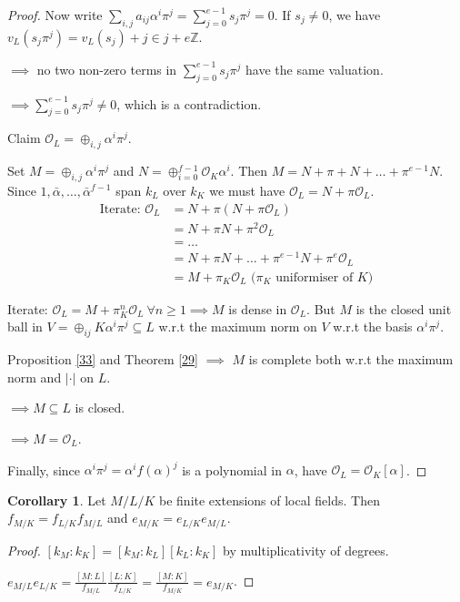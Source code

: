\documentclass[a4paper]{article}
\theoremstyle{definition}
\theoremstyle{default}
\newtheorem{corollary}[definition]{Corollary}
\theoremstyle{remark}
\newcommand*\abs[1]{\left|#1\right|}
\begin{document}
\begin{proof}
	Now write $\sum_{i,j} a_{ij}\alpha^i\pi^j = \sum_{j=0}^{e-1}s_j\pi^j = 0$.
	If $s_j \neq 0$, we have $v_L(s_j\pi^j) = v_L(s_j) + j \in j+e\mathbb{Z}$.
	
	$\implies$ no two non-zero terms in $\sum_{j=0}^{e-1}s_j\pi^j$ have the same valuation.
	
	$\implies \sum_{j=0}^{e-1} s_j\pi^j \neq 0$, which is a contradiction.
	
	Claim $\mathcal{O}_L = \oplus_{i,j}\alpha^i\pi^j$.
	
	Set $M=\oplus_{i,j}\alpha^i\pi^j$ and $N=\oplus_{i=0}^{f-1}\mathcal{O}_K\alpha^i$.
	Then $M=N+\pi+N+\dots+\pi^{e-1}N$.
	Since $1, \bar{\alpha}, \dots, \bar{\alpha}^{f-1}$ span $k_L$ over $k_K$ we must have $\mathcal{O}_L=N+\pi\mathcal{O}_L$.
	\begin{align*}
		\text{Iterate: } \mathcal{O}_L &= N + \pi(N + \pi\mathcal{O}_L) \\
		&= N + \pi N + \pi^2 \mathcal{O}_L \\
		&= \dots \\
		&= N + \pi N + \dots + \pi^{e-1}N + \pi^e \mathcal{O}_L \\
		&= M + \pi_K \mathcal{O}_L \text{ ($\pi_K$ uniformiser of $K$)}
	\end{align*}
	
	Iterate: $\mathcal{O}_L = M + \pi_K^n\mathcal{O}_L\ \forall n \geq 1 \implies M$ is dense in $\mathcal{O}_L$.
	But $M$ is the closed unit ball in $V = \oplus_{ij}K\alpha^i\pi^j \subseteq L$ w.r.t the maximum norm on $V$ w.r.t the basis $\alpha^i\pi^j$.
	
	Proposition \ref{33} and Theorem \ref{29} $\implies$ $M$ is complete both w.r.t the maximum norm and $\abs{\cdot}$ on $L$.
	
	$\implies M \subseteq L$ is closed.
	
	$\implies M = \mathcal{O}_L$.
	
	Finally, since $\alpha^i\pi^j = \alpha^if(\alpha)^j$ is a polynomial in $\alpha$, have $\mathcal{O}_L = \mathcal{O}_K[\alpha]$.
\end{proof}

\begin{corollary}
	Let $M/L/K$ be finite extensions of local fields.
	Then $f_{M/K} = f_{L/K}f_{M/L}$ and $e_{M/K} = e_{L/K}e_{M/L}$.
	\label{71}
\end{corollary}
\begin{proof}
	$[k_M:k_K] = [k_M:k_L][k_L:k_K]$ by multiplicativity of degrees.
	
	$e_{M/L}e_{L/K} = \frac{[M:L]}{f_{M/L}}\frac{[L:K]}{f_{L/K}} = \frac{[M:K]}{f_{M/K}} = e_{M/K}$.
\end{proof}
\end{document}
